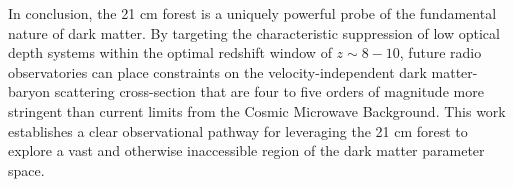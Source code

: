 \documentclass[]{article}
\begin{document}
In conclusion, the 21 cm forest is a uniquely powerful probe of the fundamental nature of dark matter. By targeting the characteristic suppression of low optical depth systems within the optimal redshift window of $z \sim 8-10$, future radio observatories can place constraints on the velocity-independent dark matter-baryon scattering cross-section that are four to five orders of magnitude more stringent than current limits from the Cosmic Microwave Background. This work establishes a clear observational pathway for leveraging the 21 cm forest to explore a vast and otherwise inaccessible region of the dark matter parameter space.


{}

\end{document}
